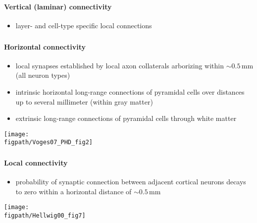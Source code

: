 \documentclass[8pt,t,usepdftitle=false]{beamer}
\def\figpath{\src/figures}
\begin{document}
\begin{frame}[plain]
  \frametitle{\ttl}
  \framesubtitle{Vertical (laminar) connectivity}
  \vspace*{-2ex}
  \begin{itemize}
  \item layer- and cell-type specific local connections
  \end{itemize}
  \begin{center}
  \end{center}
\end{frame} 
\begin{frame}[plain]
  \frametitle{\ttl}
  \framesubtitle{Horizontal connectivity}
  \begin{itemize}
  \item local synapses established by local axon collaterals arborizing within 
    $\sim{}0.5\,\text{mm}$ (all neuron types)
  \item intrinsic horizontal long-range connections of pyramidal cells 
    over distances up to several millimeter (within gray matter)
  \item extrinsic long-range connections of pyramidal cells through white matter
  \end{itemize}
  \begin{center}
    \parbox{\linewidth}{
      \texttt{[image: \\figpath/Voges07\_PHD\_fig2]}\\
    }            
  \end{center}
\end{frame}
\begin{frame}[plain]
  \frametitle{\ttl}
  \framesubtitle{Local connectivity}
  \begin{itemize}
  \item probability of synaptic connection between adjacent
    cortical neurons decays to zero within a horizontal distance of $\sim{}0.5\,\text{mm}$
  \end{itemize}
  \begin{center}
    \parbox{0.7\linewidth}{
      \texttt{[image: \\figpath/Hellwig00\_fig7]}\\
    }      
  \end{center}
\end{frame}
\end{document}
